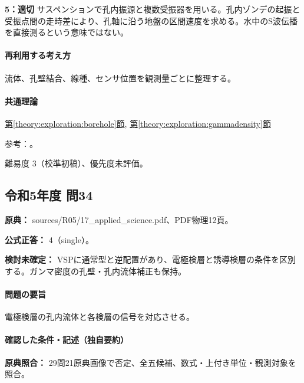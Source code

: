 \noindent\textbf{5：適切} サスペンションで孔内振源と複数受振器を用いる。孔内ゾンデの起振と受振点間の走時差により、孔軸に沿う地盤の区間速度を求める。水中のS波伝播を直接測るという意味ではない。\par

\paragraph{再利用する考え方} 流体、孔壁結合、線種、センサ位置を観測量ごとに整理する。

\paragraph{共通理論} \hyperref[theory:exploration:borehole]{第\ref*{theory:exploration:borehole}節}, \hyperref[theory:exploration:gammadensity]{第\ref*{theory:exploration:gammadensity}節}

\par 参考：\cite{epa_borehole_resistivity,epa_gamma_density,geebec_ps,oyo_suspension}。

\par 難易度 3（校準初稿）、優先度未評価。

\subsection{令和5年度 問34}
\label{q:r05-reg-applied-34}

\noindent\textbf{原典：} sources/R05/17\_applied\_science.pdf、PDF物理12頁。

\textbf{公式正答：} 4（single）。

\par\textbf{検討未確定：} VSPに通常型と逆配置があり、電極検層と誘導検層の条件を区別する。ガンマ密度の孔壁・孔内流体補正も保持。

\paragraph{問題の要旨} 電極検層の孔内流体と各検層の信号を対応させる。

\paragraph{確認した条件・記述（独自要約）}\mbox{}\par

\noindent\textbf{原典照合：} 29問21原典画像で否定、全五候補、数式・上付き単位・観測対象を照合。\par

